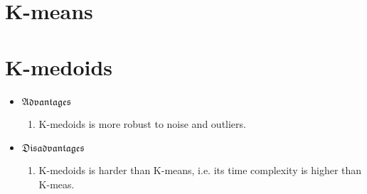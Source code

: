 \documentclass[a4paper, 10pt, titlepage]{article}
\begin{document}
\begin{enumerate}
\section{K-means}
\section{K-medoids}
\begin{itemize}
    \item $\mathfrak{Advantages}$
        \begin{enumerate}
            \item K-medoids is more robust to noise and outliers.

        \end{enumerate}
    \item $\mathfrak{Disadvantages}$
        \begin{enumerate}
            \item K-medoids is harder than K-means, i.e. its time complexity is higher than K-meas.
        \end{enumerate}
\end{itemize}
    
                    


                
\end{enumerate}
\end{document}
